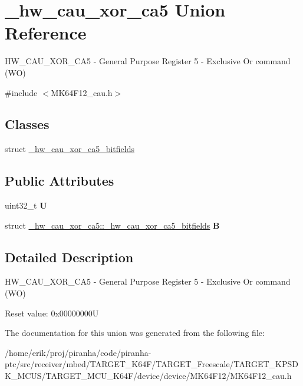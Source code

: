 \hypertarget{union__hw__cau__xor__ca5}{}\section{\+\_\+hw\+\_\+cau\+\_\+xor\+\_\+ca5 Union Reference}
\label{union__hw__cau__xor__ca5}


H\+W\+\_\+\+C\+A\+U\+\_\+\+X\+O\+R\+\_\+\+C\+A5 -\/ General Purpose Register 5 -\/ Exclusive Or command (WO)  




{\ttfamily \#include $<$M\+K64\+F12\+\_\+cau.\+h$>$}

\subsection*{Classes}
\begin{DoxyCompactItemize}
\item 
struct \hyperlink{struct__hw__cau__xor__ca5_1_1__hw__cau__xor__ca5__bitfields}{\+\_\+hw\+\_\+cau\+\_\+xor\+\_\+ca5\+\_\+bitfields}
\end{DoxyCompactItemize}
\subsection*{Public Attributes}
\begin{DoxyCompactItemize}
\item 
uint32\+\_\+t {\bfseries U}\hypertarget{union__hw__cau__xor__ca5_a7aea4db94868be70aa1cc78d42a14afd}{}\label{union__hw__cau__xor__ca5_a7aea4db94868be70aa1cc78d42a14afd}

\item 
struct \hyperlink{struct__hw__cau__xor__ca5_1_1__hw__cau__xor__ca5__bitfields}{\+\_\+hw\+\_\+cau\+\_\+xor\+\_\+ca5\+::\+\_\+hw\+\_\+cau\+\_\+xor\+\_\+ca5\+\_\+bitfields} {\bfseries B}\hypertarget{union__hw__cau__xor__ca5_ad3b05d27bf868841975c8100b89591a6}{}\label{union__hw__cau__xor__ca5_ad3b05d27bf868841975c8100b89591a6}

\end{DoxyCompactItemize}


\subsection{Detailed Description}
H\+W\+\_\+\+C\+A\+U\+\_\+\+X\+O\+R\+\_\+\+C\+A5 -\/ General Purpose Register 5 -\/ Exclusive Or command (WO) 

Reset value\+: 0x00000000U 

The documentation for this union was generated from the following file\+:\begin{DoxyCompactItemize}
\item 
/home/erik/proj/piranha/code/piranha-\/ptc/src/receiver/mbed/\+T\+A\+R\+G\+E\+T\+\_\+\+K64\+F/\+T\+A\+R\+G\+E\+T\+\_\+\+Freescale/\+T\+A\+R\+G\+E\+T\+\_\+\+K\+P\+S\+D\+K\+\_\+\+M\+C\+U\+S/\+T\+A\+R\+G\+E\+T\+\_\+\+M\+C\+U\+\_\+\+K64\+F/device/device/\+M\+K64\+F12/M\+K64\+F12\+\_\+cau.\+h\end{DoxyCompactItemize}
